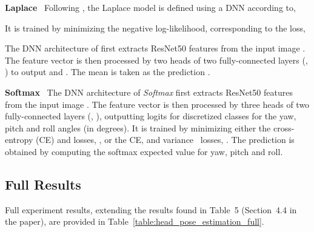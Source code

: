 \documentclass[runningheads]{llncs}
\newcommand{\parsection}[1]{\noindent\textbf{#1}~ }
\begin{document}
\begin{appendices}
\parsection{Laplace}
Following \cite{gast2018lightweight}, the Laplace model is defined using a DNN  according to,

It is trained by minimizing the negative log-likelihood, corresponding to the loss,

The DNN architecture of  first extracts ResNet50 features  from the input image . The feature vector  is then processed by two heads of two fully-connected layers (, ) to output  and . The mean  is taken as the prediction .

\parsection{Softmax}
The DNN architecture of \textit{Softmax} first extracts ResNet50 features  from the input image . The feature vector  is then processed by three heads of two fully-connected layers (, ), outputting logits for  discretized classes  for the yaw, pitch and roll angles (in degrees). It is trained by minimizing either the cross-entropy (CE) and  losses, , or the CE,  and variance~\cite{pan2018mean} losses, . The prediction  is obtained by computing the softmax expected value for yaw, pitch and roll. 



\subsection{Full Results}

Full experiment results, extending the results found in Table~5 (Section~4.4 in the paper), are provided in Table~\ref{table:head_pose_estimation_full}. \end{appendices}
\end{document}
